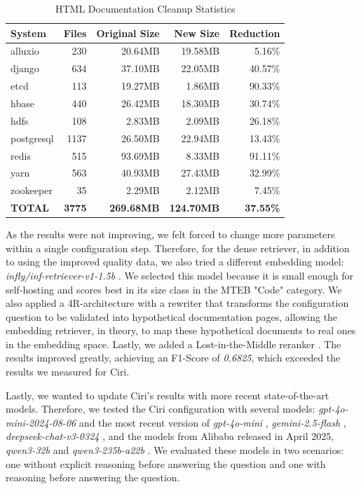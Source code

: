 \begin{table}[h]
    \centering
    \begin{tabular}{|l|r|r|r|r|}
        \hline
        \textbf{System} & \textbf{Files} & \textbf{Original Size} & \textbf{New Size} & \textbf{Reduction} \\
        \hline
        alluxio & 230 & 20.64MB & 19.58MB & 5.16\% \\
        django & 634 & 37.10MB & 22.05MB & 40.57\% \\
        etcd & 113 & 19.27MB & 1.86MB & 90.33\% \\
        hbase & 440 & 26.42MB & 18.30MB & 30.74\% \\
        hdfs & 108 & 2.83MB & 2.09MB & 26.18\% \\
        postgresql & 1137 & 26.50MB & 22.94MB & 13.43\% \\
        redis & 515 & 93.69MB & 8.33MB & 91.11\% \\
        yarn & 563 & 40.93MB & 27.43MB & 32.99\% \\
        zookeeper & 35 & 2.29MB & 2.12MB & 7.45\% \\
        \hline
        \textbf{TOTAL} & \textbf{3775} & \textbf{269.68MB} & \textbf{124.70MB} & \textbf{37.55\%} \\
        \hline
    \end{tabular}
    \caption{HTML Documentation Cleanup Statistics}
    \label{tab:cleanup_stats}
\end{table}

As the results were not improving, we felt forced to change more parameters within a single configuration step. Therefore, for the dense retriever, in addition to using the improved quality data, we also tried a different embedding model: \textit{infly/inf-retriever-v1-1.5b} \cite{inflyai2025}. We selected this model because it is small enough for self-hosting and scores best in its size class in the MTEB \cite{muennighoff2022mteb}\cite{MTEB} "Code" category. We also applied a 4R-architecture with a rewriter that transforms the configuration question to be validated into hypothetical documentation pages, allowing the embedding retriever, in theory, to map these hypothetical documents to real ones in the embedding space. Lastly, we added a Lost-in-the-Middle reranker \cite{Liu.06.07.2023}. The results improved greatly, achieving an F1-Score of \textit{0.6825}, which exceeded the results we measured for Ciri.


Lastly, we wanted to update Ciri's results with more recent state-of-the-art models. Therefore, we tested the Ciri configuration with several models: \textit{gpt-4o-mini-2024-08-06} and the most recent version of \textit{gpt-4o-mini} \cite{OpenAI_2022}, \textit{gemini-2.5-flash} \cite{gemini-2.0}, \textit{deepseek-chat-v3-0324} \cite{deepseekai2024deepseekv3technicalreport}, and the models from Alibaba released in April 2025, \textit{qwen3-32b} and \textit{qwen3-235b-a22b} \cite{qwen3}. We evaluated these models in two scenarios: one without explicit reasoning before answering the question and one with reasoning before answering the question. 

